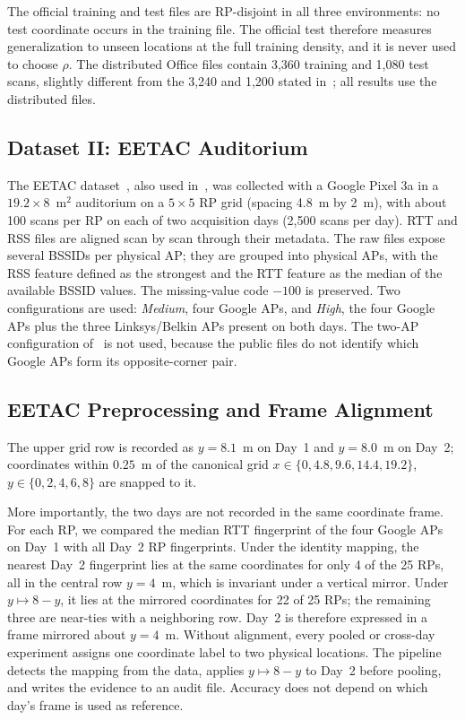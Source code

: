 The official training and test files are RP-disjoint in all three environments: no test coordinate occurs in the training file. The official test therefore measures generalization to unseen locations at the full training density, and it is never used to choose $\rho$. The distributed Office files contain 3,360 training and 1,080 test scans, slightly different from the 3,240 and 1,200 stated in~\cite{feng2026robust}; all results use the distributed files.

\subsection{Dataset II: EETAC Auditorium}
\label{subsec:eetac_dataset}

The EETAC dataset~\cite{martinescalona2023ftm}, also used in~\cite{gonzalezdiaz2026scalable}, was collected with a Google Pixel 3a in a $19.2\times8$~m$^2$ auditorium on a $5\times5$ RP grid (spacing 4.8~m by 2~m), with about 100 scans per RP on each of two acquisition days (2,500 scans per day). RTT and RSS files are aligned scan by scan through their metadata. The raw files expose several BSSIDs per physical AP; they are grouped into physical APs, with the RSS feature defined as the strongest and the RTT feature as the median of the available BSSID values. The missing-value code $-100$ is preserved. Two configurations are used: \emph{Medium}, four Google APs, and \emph{High}, the four Google APs plus the three Linksys/Belkin APs present on both days. The two-AP configuration of~\cite{gonzalezdiaz2026scalable} is not used, because the public files do not identify which Google APs form its opposite-corner pair.

\subsection{EETAC Preprocessing and Frame Alignment}
\label{subsec:preprocessing}

The upper grid row is recorded as $y=8.1$~m on Day~1 and $y=8.0$~m on Day~2; coordinates within $0.25$~m of the canonical grid $x\in\{0,4.8,9.6,14.4,19.2\}$, $y\in\{0,2,4,6,8\}$ are snapped to it.

More importantly, the two days are not recorded in the same coordinate frame. For each RP, we compared the median RTT fingerprint of the four Google APs on Day~1 with all Day~2 RP fingerprints. Under the identity mapping, the nearest Day~2 fingerprint lies at the same coordinates for only 4 of the 25 RPs, all in the central row $y=4$~m, which is invariant under a vertical mirror. Under $y\mapsto 8-y$, it lies at the mirrored coordinates for 22 of 25 RPs; the remaining three are near-ties with a neighboring row. Day~2 is therefore expressed in a frame mirrored about $y=4$~m. Without alignment, every pooled or cross-day experiment assigns one coordinate label to two physical locations. The pipeline detects the mapping from the data, applies $y\mapsto8-y$ to Day~2 before pooling, and writes the evidence to an audit file. Accuracy does not depend on which day's frame is used as reference.

